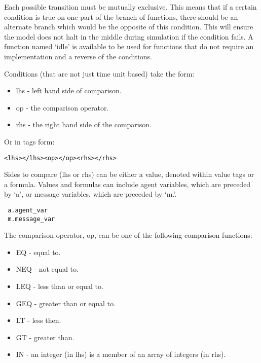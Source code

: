 Each possible transition
must be mutually exclusive. This means that if a certain condition is true on one part of the branch of functions, there should be an alternate branch which would be the opposite of this condition. This will ensure the model does not halt in the middle during simulation if the condition fails. A function named `idle' is available to be used for
functions that do not require an implementation and a reverse of the conditions.

Conditions (that are not just time unit based) take the form:

\begin{itemize}
  \item lhs - left hand side of comparison.
  \item op - the comparison operator.
  \item rhs - the right hand side of the comparison.
\end{itemize}

Or in tags form:

\begin{mylisting}
\begin{verbatim}
<lhs></lhs><op></op><rhs></rhs>
\end{verbatim}
\end{mylisting}

Sides to compare (lhs or rhs) can be either a value, denoted within value tags or
a formula. 
Values and formulas can include agent variables, which are preceded by `a', or message variables, which are preceded by `m.'.

 \begin{mylisting}
 \begin{verbatim}
 a.agent_var
 m.message_var
 \end{verbatim}
 \end{mylisting}

The comparison operator, op, can be one of the following comparison functions:

\begin{itemize}
\item EQ - equal to.
\item NEQ - not equal to.
\item LEQ - less than or equal to.
\item GEQ - greater than or equal to.
\item LT - less then.
\item GT - greater than.
\item IN - an integer (in lhs) is a member of an array of integers (in rhs).
\end{itemize}

